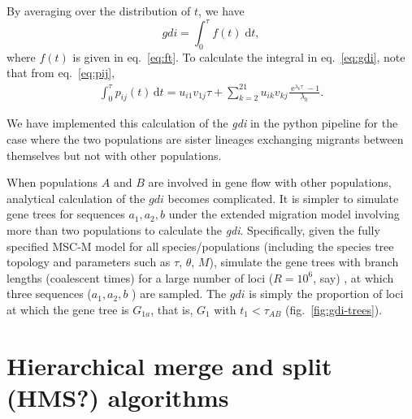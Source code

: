 \documentclass[A4]{article1}
\renewcommand{\d}{\mathrm{d}}
\DeclareMathOperator{\e}{\mathrm{e}}
\begin{document}
By averaging over the distribution of $t$, we have 
\begin{equation} \label{eq:gdi} 
    gdi = \int_0^\tau f(t) \; \d t ,
\end{equation}
where $f(t)$ is given in eq.~\ref{eq:ft}. To calculate the integral in eq.~\ref{eq:gdi},
note that from eq.~\ref{eq:pij},
\begin{equation} 
   \begin{aligned}
      \int_0^\tau p_{ij}(t) \,\d t = 
       u_{i1} v_{1j}\tau %
       + \sum_{k=2}^{21} u_{ik} v_{kj} \frac{\e^{\lambda_k \tau} - 1}{\lambda_k} .
   \end{aligned}
\end{equation}

We have implemented this calculation of the \textit{gdi} in the python pipeline for the
case where the two populations are sister lineages exchanging migrants between
themselves but not with other populations.

When populations $A$ and $B$ are involved in gene flow with other populations,
analytical calculation of the $gdi$ becomes complicated.  It is simpler to simulate gene
trees for sequences $a_1, a_2, b$ under the extended migration model involving more than
two populations to calculate the \textit{gdi}.  Specifically, given the fully specified
MSC-M model for all species/populations (including the species tree topology and
parameters such as $\tau$, $\theta$, $M$), simulate the gene trees with branch lengths
(coalescent times) for a large number of loci ($R = 10^6$, say) , at which three
sequences ($a_1, a_2, b$ ) are sampled.  The $gdi$ is simply the proportion of loci at
which the gene tree is $G_{1a}$, that is, $G_1$ with $t_1 < \tau_{AB}$
(fig.~\ref{fig:gdi-trees}).


\section{Hierarchical merge and split (HMS?) algorithms}
\end{document}
